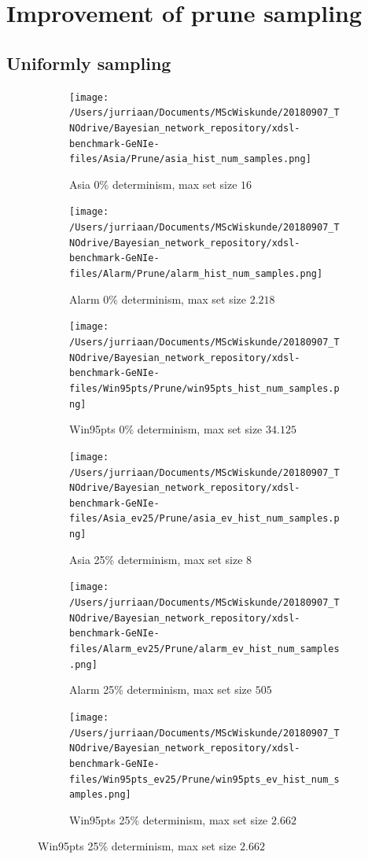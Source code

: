 \documentclass[a4paper, twoside, 11pt]{report}
\theoremstyle{plain}
\theoremstyle{definition}
\theoremstyle{remark}
\begin{document}
\chapter{Improvement of prune sampling}\label{ch:5}
\section{Uniformly sampling}
\begin{figure}[h!]
\centering
\captionsetup[subfigure]{justification=centering}

\begin{subfigure}{.3\linewidth}
\texttt{[image: /Users/jurriaan/Documents/MScWiskunde/20180907\_TNOdrive/Bayesian\_network\_repository/xdsl-benchmark-GeNIe-files/Asia/Prune/asia\_hist\_num\_samples.png]}
\caption{Asia 0\% determinism, max set size $16$}%
\label{asia_ev}%
\end{subfigure}\hfill%
\begin{subfigure}{.3\linewidth}
\texttt{[image: /Users/jurriaan/Documents/MScWiskunde/20180907\_TNOdrive/Bayesian\_network\_repository/xdsl-benchmark-GeNIe-files/Alarm/Prune/alarm\_hist\_num\_samples.png]}
\caption{Alarm 0\% determinism, max set size $2.218$}%
\label{alarm_ev}%
\end{subfigure}\hfill%
\begin{subfigure}{.3\linewidth}
\texttt{[image: /Users/jurriaan/Documents/MScWiskunde/20180907\_TNOdrive/Bayesian\_network\_repository/xdsl-benchmark-GeNIe-files/Win95pts/Prune/win95pts\_hist\_num\_samples.png]}
\caption{Win95pts 0\% determinism, max set size $34.125$}%
\label{win95pts_ev}%
\end{subfigure}\hfill%

\begin{subfigure}{.3\linewidth}
\texttt{[image: /Users/jurriaan/Documents/MScWiskunde/20180907\_TNOdrive/Bayesian\_network\_repository/xdsl-benchmark-GeNIe-files/Asia\_ev25/Prune/asia\_ev\_hist\_num\_samples.png]}
\caption{Asia 25\% determinism, max set size $8$}%
\label{asia_ev}%
\end{subfigure}\hfill%
\begin{subfigure}{.3\linewidth}
\texttt{[image: /Users/jurriaan/Documents/MScWiskunde/20180907\_TNOdrive/Bayesian\_network\_repository/xdsl-benchmark-GeNIe-files/Alarm\_ev25/Prune/alarm\_ev\_hist\_num\_samples.png]}
\caption{Alarm 25\% determinism, max set size $505$}%
\label{alarm_ev}%
\end{subfigure}\hfill%
\begin{subfigure}{.3\linewidth}
\texttt{[image: /Users/jurriaan/Documents/MScWiskunde/20180907\_TNOdrive/Bayesian\_network\_repository/xdsl-benchmark-GeNIe-files/Win95pts\_ev25/Prune/win95pts\_ev\_hist\_num\_samples.png]}
\caption{Win95pts 25\% determinism, max set size $2.662$}%
\label{win95pts_ev}%
\end{subfigure}\hfill%


\end{figure}
\end{document}
